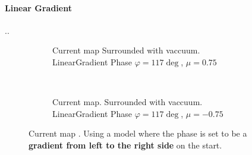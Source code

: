 \documentclass[../main.tex]{subfiles}
\begin{document}
\paragraph{Linear Gradient}..
\begin{figure}[H]
    \begin{subfigure}{0.4\textwidth}
        \centering
        \hspace{-4cm} %
        
        \caption{Current map Surrounded with vaccuum. LinearGradient Phase $\varphi = 117\deg$, $\mu = 0.75$}
        \label{fig:first}
    \end{subfigure}    \\
    \begin{subfigure}{0.4\textwidth}
        \centering
        \hspace{-4cm} %
        
        \caption{Current map. Surrounded with vaccuum. LinearGradient Phase $\varphi = 117\deg$, $\mu = -0.75$}
        \label{fig:first}
    \end{subfigure}    
    \caption{Current map . Using a model where the phase is set to be a \textbf{gradient from left to the right side} on the start.}
\end{figure}
\end{document}
